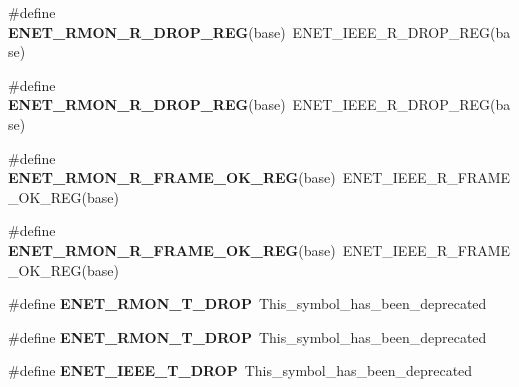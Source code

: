 \begin{DoxyCompactItemize}
\item 
\#define {\bfseries E\+N\+E\+T\+\_\+\+R\+M\+O\+N\+\_\+\+R\+\_\+\+D\+R\+O\+P\+\_\+\+R\+EG}(base)~E\+N\+E\+T\+\_\+\+I\+E\+E\+E\+\_\+\+R\+\_\+\+D\+R\+O\+P\+\_\+\+R\+EG(base)\hypertarget{group__Backward__Compatibility__Symbols_gaa42b3294937bb78ddcb71cbc54151c85}{}\label{group__Backward__Compatibility__Symbols_gaa42b3294937bb78ddcb71cbc54151c85}

\item 
\#define {\bfseries E\+N\+E\+T\+\_\+\+R\+M\+O\+N\+\_\+\+R\+\_\+\+D\+R\+O\+P\+\_\+\+R\+EG}(base)~E\+N\+E\+T\+\_\+\+I\+E\+E\+E\+\_\+\+R\+\_\+\+D\+R\+O\+P\+\_\+\+R\+EG(base)\hypertarget{group__Backward__Compatibility__Symbols_gaa42b3294937bb78ddcb71cbc54151c85}{}\label{group__Backward__Compatibility__Symbols_gaa42b3294937bb78ddcb71cbc54151c85}

\item 
\#define {\bfseries E\+N\+E\+T\+\_\+\+R\+M\+O\+N\+\_\+\+R\+\_\+\+F\+R\+A\+M\+E\+\_\+\+O\+K\+\_\+\+R\+EG}(base)~E\+N\+E\+T\+\_\+\+I\+E\+E\+E\+\_\+\+R\+\_\+\+F\+R\+A\+M\+E\+\_\+\+O\+K\+\_\+\+R\+EG(base)\hypertarget{group__Backward__Compatibility__Symbols_gaa157073b7098ee58966120129393c9ec}{}\label{group__Backward__Compatibility__Symbols_gaa157073b7098ee58966120129393c9ec}

\item 
\#define {\bfseries E\+N\+E\+T\+\_\+\+R\+M\+O\+N\+\_\+\+R\+\_\+\+F\+R\+A\+M\+E\+\_\+\+O\+K\+\_\+\+R\+EG}(base)~E\+N\+E\+T\+\_\+\+I\+E\+E\+E\+\_\+\+R\+\_\+\+F\+R\+A\+M\+E\+\_\+\+O\+K\+\_\+\+R\+EG(base)\hypertarget{group__Backward__Compatibility__Symbols_gaa157073b7098ee58966120129393c9ec}{}\label{group__Backward__Compatibility__Symbols_gaa157073b7098ee58966120129393c9ec}

\item 
\#define {\bfseries E\+N\+E\+T\+\_\+\+R\+M\+O\+N\+\_\+\+T\+\_\+\+D\+R\+OP}~This\+\_\+symbol\+\_\+has\+\_\+been\+\_\+deprecated\hypertarget{group__Backward__Compatibility__Symbols_gac5608b729470cc47103c854e2f880d9c}{}\label{group__Backward__Compatibility__Symbols_gac5608b729470cc47103c854e2f880d9c}

\item 
\#define {\bfseries E\+N\+E\+T\+\_\+\+R\+M\+O\+N\+\_\+\+T\+\_\+\+D\+R\+OP}~This\+\_\+symbol\+\_\+has\+\_\+been\+\_\+deprecated\hypertarget{group__Backward__Compatibility__Symbols_gac5608b729470cc47103c854e2f880d9c}{}\label{group__Backward__Compatibility__Symbols_gac5608b729470cc47103c854e2f880d9c}

\item 
\#define {\bfseries E\+N\+E\+T\+\_\+\+I\+E\+E\+E\+\_\+\+T\+\_\+\+D\+R\+OP}~This\+\_\+symbol\+\_\+has\+\_\+been\+\_\+deprecated\hypertarget{group__Backward__Compatibility__Symbols_ga8ae049d1d1c7c61611a6f6ddcf760e96}{}\label{group__Backward__Compatibility__Symbols_ga8ae049d1d1c7c61611a6f6ddcf760e96}


\end{DoxyCompactItemize}
